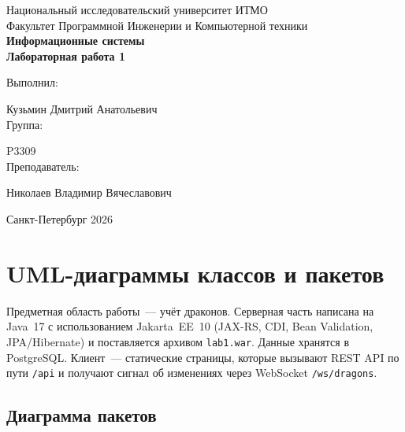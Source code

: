 \documentclass[12pt,a4paper]{article}
\begin{document}
\begin{titlepage}

\begin{center}
    \LARGE Национальный исследовательский университет ИТМО\\[8mm]

    Факультет Программной Инженерии и Компьютерной техники\\[37mm]

    \huge \textbf{Информационные системы}\\[2mm]
    \textbf{Лабораторная работа 1} \\[2mm]



\end{center}

\vfill




\begin{flushright}

    \large Выполнил:

    Кузьмин Дмитрий Анатольевич\\[3mm]

    Группа:

    P3309\\[3mm]

    Преподаватель:

    Николаев Владимир Вячеславович
\end{flushright}


\vfill

\begin{center}
    Санкт-Петербург 2026
\end{center}

\end{titlepage}

\section{UML-диаграммы классов и пакетов}

Предметная область работы~--- учёт драконов. Серверная часть написана на Java~17 с использованием Jakarta~EE~10 (JAX-RS, CDI, Bean Validation, JPA/Hibernate) и поставляется архивом \texttt{lab1.war}. Данные хранятся в PostgreSQL. Клиент~--- статические страницы, которые вызывают REST API по пути \texttt{/api} и получают сигнал об изменениях через WebSocket \texttt{/ws/dragons}.

\subsection{Диаграмма пакетов}
\end{document}
